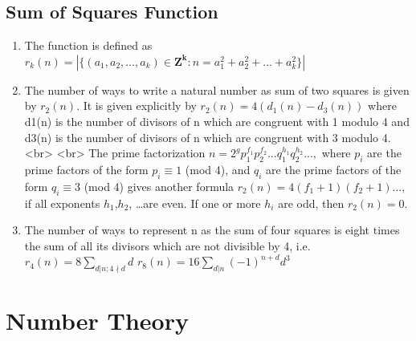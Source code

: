 \subsection{Sum of Squares Function}
\begin{enumerate}
\item The function is defined as  
     $r_{k}\left(n\right) = \left|\{\left(a_{1},a_{2}, \ldots ,a_{k} \right) \in \mathbf{Z^{k}} : n=a_{1}^{2}+a_{2}^{2}+ \ldots +a_{k}^{2}\}\right|$  
\item  The number of ways to write a natural number as sum of two squares is given by $r_2(n)$. It is given explicitly by  
    $r_{2}\left(n\right) = 4\left(d_{1}\left(n\right) - d_{3}\left(n\right)\right)$ 
    where d1(n) is the number of divisors of n which are congruent with 1 modulo 4 and d3(n) is the number of divisors of n which are congruent with 3 modulo 4.  <br> <br>
    The prime factorization $n = 2^{g}p_{1}^{f_{1}}p_{2}^{f_{2}}. . .q_{1}^{h_{1}}q_{2}^{h_{2}}. . . ,$  where $\displaystyle p_{i}$ are the prime factors of the form $\displaystyle p_{i} \equiv 1$ (mod 4), and $q_{i}$ are the prime factors of the form $q_{i} \equiv 3$ (mod 4) gives another formula   $r_{2}\left(n\right) = 4\left(f_{1}+1\right)\left(f_{2}+1\right) \ldots ,$ if all exponents $h_{1}$,$h_{2}$, \ldots  are even. If one or more $h_{i}$ are odd, then $r_{2}\left(n\right) = 0.$  
\item The number of ways to represent n as the sum of four squares is eight times the sum of all its divisors which are not divisible by 4, i.e.  
     $r_{4}\left( n \right) = 8 \displaystyle\sum _{d| n;4 \nmid d}d$    
     $r_{8}\left(n\right) = 16 \displaystyle\sum _{d|n} \left(-1\right)^{n+d}d^{3}$    
\end{enumerate}


\section{Number Theory}

